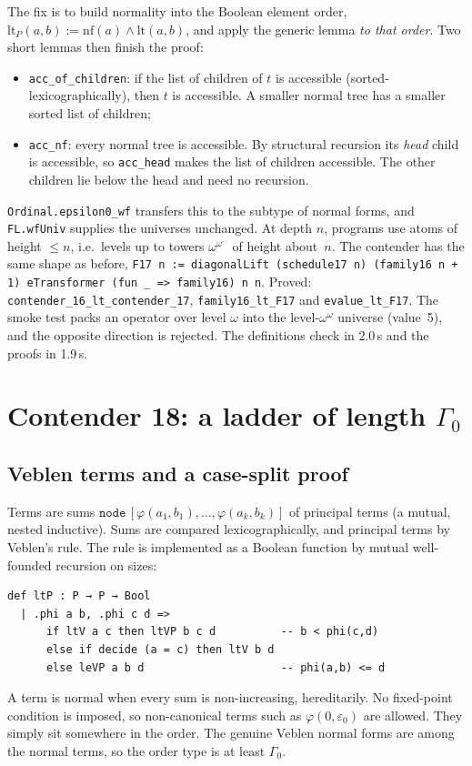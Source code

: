 \documentclass[11pt]{article}
\theoremstyle{definition}
\theoremstyle{remark}
\newcommand{\lean}[1]{\texttt{#1}}
\begin{document}
The fix is to build normality into the Boolean element order,
$\mathrm{lt}_P(a,b) := \mathrm{nf}(a)\wedge \mathrm{lt}(a,b)$, and apply the
generic lemma \emph{to that order}. Two short lemmas then finish the
proof:
\begin{itemize}
\item \lean{acc\_of\_children}: if the list of children of $t$ is accessible
  (sorted-lexicographically), then $t$ is accessible. A smaller normal tree has
  a smaller sorted list of children;
\item \lean{acc\_nf}: every normal tree is accessible. By structural
  recursion its \emph{head} child is accessible, so \lean{acc\_head} makes the
  list of children accessible. The other children lie below the head and need
  no recursion.
\end{itemize}
\lean{Ordinal.epsilon0\_wf} transfers this to the subtype of normal forms, and
\lean{FL.wfUniv} supplies the universes unchanged. At depth $n$, programs use
atoms of height $\le n$, i.e.\ levels up to towers $\omega^{\omega^{\cdots}}$ of
height about~$n$. The contender has the same shape as before,
\lean{F17 n := diagonalLift (schedule17 n) (family16 n + 1) eTransformer (fun \_ => family16) n n}.
Proved: \lean{contender\_16\_lt\_\allowbreak contender\_17}, \lean{family16\_lt\_F17}
and \lean{evalue\_lt\_F17}. The smoke test packs an operator over level
$\omega$ into the level-$\omega^\omega$ universe (value~5), and the
opposite direction is rejected. The definitions check in 2.0\,s and the proofs
in 1.9\,s.

\section{Contender 18: a ladder of length \texorpdfstring{$\Gamma_0$}{Gamma0}}

\subsection{Veblen terms and a case-split proof}
Terms are sums $\mathtt{node}\,[\varphi(a_1,b_1),\dots,\varphi(a_k,b_k)]$ of
principal terms (a mutual, nested inductive). Sums are compared
lexicographically, and principal terms by Veblen's rule. The rule is
implemented as a Boolean function by mutual well-founded recursion on sizes:
\begin{lstlisting}
def ltP : P → P → Bool
  | .phi a b, .phi c d =>
      if ltV a c then ltVP b c d          -- b < phi(c,d)
      else if decide (a = c) then ltV b d
      else leVP a b d                     -- phi(a,b) <= d
\end{lstlisting}
A term is normal when every sum is non-increasing, hereditarily. No
fixed-point condition is imposed, so non-canonical terms such as
$\varphi(0,\varepsilon_0)$ are allowed. They simply sit somewhere in the
order. The genuine Veblen normal forms are among the normal terms, so the order
type is at least $\Gamma_0$.
\end{document}
